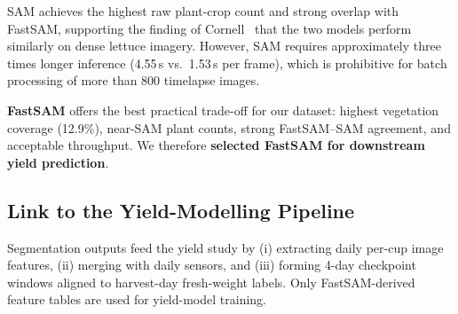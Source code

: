 SAM achieves the highest raw plant-crop count and strong overlap with FastSAM, supporting the
finding of Cornell~\cite{cornell2024} that the two models perform similarly on dense lettuce
imagery.
However, SAM requires approximately three times longer inference (4.55\,s vs.\ 1.53\,s per
frame), which is prohibitive for batch processing of more than 800 timelapse images.

\textbf{FastSAM} offers the best practical trade-off for our dataset: highest vegetation
coverage (12.9\%), near-SAM plant counts, strong FastSAM--SAM agreement, and acceptable
throughput. We therefore \textbf{selected FastSAM for downstream yield prediction}.

\subsection{Link to the Yield-Modelling Pipeline}
\label{sec:yield_pipeline}

Segmentation outputs feed the yield study by (i) extracting daily per-cup image features, (ii)
merging with daily sensors, and (iii) forming 4-day checkpoint windows aligned to harvest-day
fresh-weight labels. Only FastSAM-derived feature tables are used for yield-model training.
